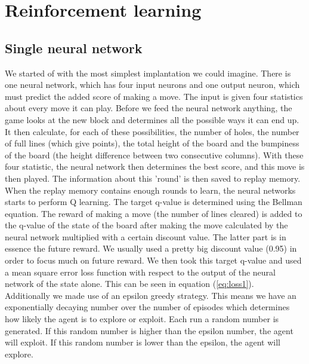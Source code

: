 \documentclass{report}
\begin{document}
\section{Reinforcement learning}
\subsection{Single neural network}
We started of with the most simplest implantation we could imagine. There is one neural network, which has four input neurons and one output neuron, which must predict the added score of making a move. The input is given four statistics about every move it can play. Before we feed the neural network anything, the game looks at the new block and determines all the possible ways it can end up. It then calculate, for each of these possibilities, the number of holes, the number of full lines (which give points), the total height of the board and the bumpiness of the board (the height difference between two consecutive columns). With these four statistic, the neural network then determines the best score, and this move is then played. The information about this 'round' is then saved to replay memory. When the replay memory contains enough rounds to learn, the neural networks starts to perform Q learning. The target q-value is determined using the Bellman equation. The reward of making a move (the number of lines cleared) is added to the q-value of the state of the board after making the move calculated by the neural network multiplied with a certain discount value. The latter part is in essence the future reward. We usually used a pretty big discount value (0.95) in order to focus much on future reward. We then took this target q-value and used a mean square error loss function with respect to the output of the neural network of the state alone. This can be seen in equation (\ref{eq:loss1}).\\
Additionally we made use of an epsilon greedy strategy. This means we have an exponentially decaying number over the number of episodes which determines how likely the agent is to explore or exploit. Each run a random number is generated. If this random number is higher than the epsilon number, the agent will exploit. If this random number is lower than the epsilon, the agent will explore. \\
\end{document}
